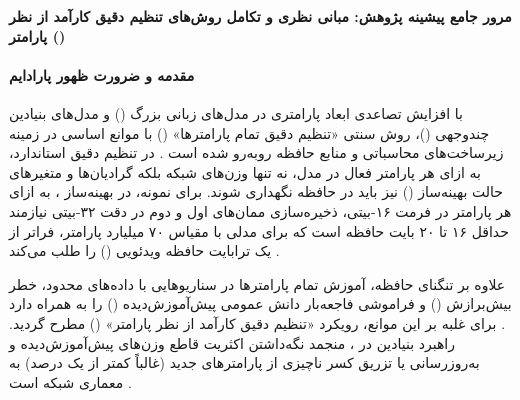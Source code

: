 \item \textbf{مرور جامع پیشینه پژوهش: مبانی نظری و تکامل روش‌های تنظیم دقیق کارآمد از نظر پارامتر ()}

\paragraph*{مقدمه و ضرورت ظهور پارادایم }
با افزایش تصاعدی ابعاد پارامتری در مدل‌های زبانی بزرگ () و مدل‌های بنیادین چندوجهی ()، روش سنتی «تنظیم دقیق تمام پارامترها» () با موانع اساسی در زمینه زیرساخت‌های محاسباتی و منابع حافظه روبه‌رو شده است \cite{han2024peft, zhang2025survey, prottasha2025pefta2z}. در تنظیم دقیق استاندارد، به ازای هر پارامتر فعال در مدل، نه تنها وزن‌های شبکه بلکه گرادیان‌ها و متغیرهای حالت بهینه‌ساز () نیز باید در حافظه  نگهداری شوند. برای نمونه، در بهینه‌ساز ، به ازای هر پارامتر در فرمت ۱۶-بیتی، ذخیره‌سازی ممان‌های اول و دوم در دقت ۳۲-بیتی نیازمند حداقل ۱۶ تا ۲۰ بایت حافظه است که برای مدلی با مقیاس ۷۰ میلیارد پارامتر، فراتر از یک ترابایت حافظه ویدئویی () را طلب می‌کند \cite{han2024peft, liu2025look}.

علاوه بر تنگنای حافظه، آموزش تمام پارامترها در سناریوهایی با داده‌های محدود، خطر بیش‌برازش () و فراموشی فاجعه‌بار دانش عمومی پیش‌آموزش‌دیده () را به همراه دارد \cite{steele2026noise, zindari2026lora}. برای غلبه بر این موانع، رویکرد «تنظیم دقیق کارآمد از نظر پارامتر» () مطرح گردید. راهبرد بنیادین در ، منجمد نگه‌داشتن اکثریت قاطع وزن‌های پیش‌آموزش‌دیده و به‌روزرسانی یا تزریق کسر ناچیزی از پارامترهای جدید (غالباً کمتر از یک درصد) به معماری شبکه است \cite{hu2022lora, zhang2025survey}.

